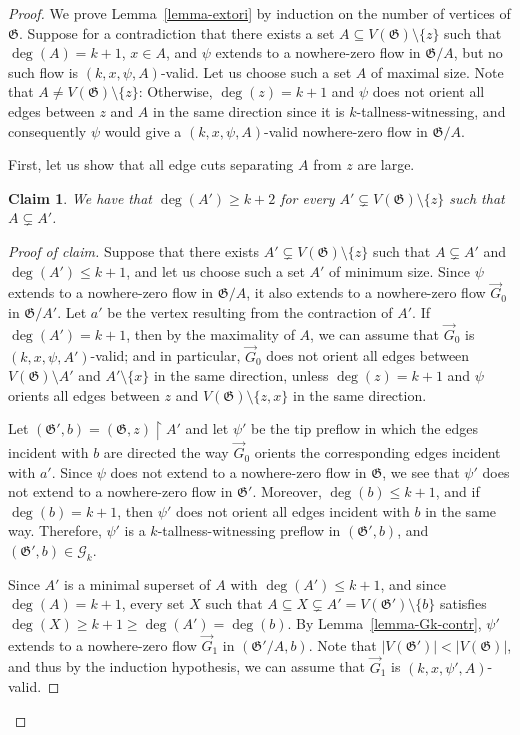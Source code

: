 \documentclass{article}
\newcommand{\GG}{\mathcal{G}}
\newcommand\g{\mathfrak{G}}
\newtheorem*{claim*}{Claim}
\newenvironment{subproof}{%
  \renewcommand{\qedsymbol}{$\blacksquare$}%
  \begin{proof}[Proof of claim]%
}{%
  \end{proof}%
}
\begin{document}
\begin{proof}
We prove Lemma~\ref{lemma-extori} by induction on the number of vertices of $\g$.  
Suppose for a contradiction that there exists a set $A\subseteq V(\g)\setminus \{z\}$ such that $\deg(A)=k+1$, $x\in A$, and $\psi$ extends to a
nowhere-zero flow in $\g/A$, but no such flow is $(k, x,\psi,A)$-valid.
Let us choose such a set $A$ of maximal size.  Note that $A\neq V(\g)\setminus \{z\}$: Otherwise,
$\deg(z)=k+1$ and $\psi$ does not orient all edges between $z$ and $A$ in the same direction since it is $k$-tallness-witnessing,
and consequently $\psi$ would give a $(k, x,\psi,A)$-valid nowhere-zero flow in $\g/A$.

First, let us show that all edge cuts separating $A$ from $z$ are large.
\begin{claim*}
\label{subclaim:insideGKcontract}
We have that $\deg(A')\ge k+2$ for every $A'\subsetneq V(\g)\setminus \{z\}$ such that $A\subsetneq A'$.
\end{claim*}
\begin{subproof}
Suppose that there exists $A'\subsetneq V(\g)\setminus \{z\}$ such that $A\subsetneq A'$
and $\deg(A') \le k+1$, and let us choose such a set $A'$ of minimum size.
Since $\psi$ extends to a nowhere-zero flow in $\g/A$, it also extends to a nowhere-zero flow $\vec{G}_0$ in $\g/A'$.
Let $a'$ be the vertex resulting from the contraction of $A'$.
If $\deg(A')=k+1$, then by the maximality of $A$, we can assume that $\vec{G}_0$ is $(k,x,\psi,A')$-valid;
and in particular, $\vec{G}_0$ does not orient all edges between $V(\g)\setminus A'$ and $A'\setminus \{x\}$ in the
same direction, unless $\deg(z)=k+1$ and $\psi$ orients all edges between $z$ and $V(\g)\setminus\{z,x\}$ in the same direction.

Let $(\g',b)=(\g,z)\restriction A'$ and let $\psi'$ be the tip preflow in which the edges incident with $b$
are directed the way $\vec{G}_0$ orients the corresponding edges incident with $a'$.  Since $\psi$ does not
extend to a nowhere-zero flow in $\g$, we see that $\psi'$ does not extend to a nowhere-zero flow in $\g'$.
Moreover, $\deg(b)\le k+1$, and if $\deg(b)=k+1$, then $\psi'$ does not orient all edges incident with $b$ in the same way.
Therefore, $\psi'$ is a $k$-tallness-witnessing preflow in $(\g',b)$, and $(\g',b)\in\GG_k$.

Since $A'$ is a minimal superset of $A$ with $\deg(A')\le k+1$, and since $\deg(A)=k+1$,
every set $X$ such that $A\subseteq X\subsetneq A'=V(\g')\setminus\{b\}$ satisfies $\deg(X)\ge k+1\ge \deg(A')=\deg(b)$.
By Lemma~\ref{lemma-Gk-contr}, $\psi'$ extends to a nowhere-zero flow $\vec{G}_1$ in $(\g'/A,b)$.
Note that $|V(\g')|<|V(\g)|$, and thus by the induction hypothesis, we can assume that $\vec{G}_1$
is $(k,x,\psi',A)$-valid.


\end{subproof}
\end{proof}
\end{document}
